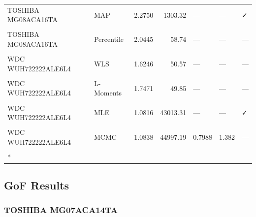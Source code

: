 \documentclass[
]{article}
\begin{document}
\begin{longtable}[t]{llrrlll}
\addlinespace
TOSHIBA MG08ACA16TA & MAP & 2.2750 & 1303.32 & — & — & ✓\\
\cellcolor{gray!10}{TOSHIBA MG08ACA16TA} & \cellcolor{gray!10}{MCMC} & \cellcolor{gray!10}{1.2643} & \cellcolor{gray!10}{12023.10} & \cellcolor{gray!10}{1.001} & \cellcolor{gray!10}{1.5386} & \cellcolor{gray!10}{—}\\
TOSHIBA MG08ACA16TA & Percentile & 2.0445 & 58.74 & — & — & —\\
\cellcolor{gray!10}{WDC WUH722222ALE6L4} & \cellcolor{gray!10}{OLS} & \cellcolor{gray!10}{1.5872} & \cellcolor{gray!10}{50.96} & \cellcolor{gray!10}{—} & \cellcolor{gray!10}{—} & \cellcolor{gray!10}{—}\\
WDC WUH722222ALE6L4 & WLS & 1.6246 & 50.57 & — & — & —\\
\addlinespace
\cellcolor{gray!10}{WDC WUH722222ALE6L4} & \cellcolor{gray!10}{MOM} & \cellcolor{gray!10}{1.8085} & \cellcolor{gray!10}{49.94} & \cellcolor{gray!10}{—} & \cellcolor{gray!10}{—} & \cellcolor{gray!10}{—}\\
WDC WUH722222ALE6L4 & L-Moments & 1.7471 & 49.85 & — & — & —\\
\cellcolor{gray!10}{WDC WUH722222ALE6L4} & \cellcolor{gray!10}{EPF} & \cellcolor{gray!10}{1.8787} & \cellcolor{gray!10}{50.02} & \cellcolor{gray!10}{—} & \cellcolor{gray!10}{—} & \cellcolor{gray!10}{—}\\
WDC WUH722222ALE6L4 & MLE & 1.0816 & 43013.31 & — & — & ✓\\
\cellcolor{gray!10}{WDC WUH722222ALE6L4} & \cellcolor{gray!10}{MAP} & \cellcolor{gray!10}{2.5148} & \cellcolor{gray!10}{1189.11} & \cellcolor{gray!10}{—} & \cellcolor{gray!10}{—} & \cellcolor{gray!10}{✓}\\
\addlinespace
WDC WUH722222ALE6L4 & MCMC & 1.0838 & 44997.19 & 0.7988 & 1.382 & —\\
\cellcolor{gray!10}{WDC WUH722222ALE6L4} & \cellcolor{gray!10}{Percentile} & \cellcolor{gray!10}{1.9762} & \cellcolor{gray!10}{53.73} & \cellcolor{gray!10}{—} & \cellcolor{gray!10}{—} & \cellcolor{gray!10}{—}\\*
\end{longtable}
\endgroup{}

\subsection{GoF Results}\label{gof-results}

\subsubsection{TOSHIBA MG07ACA14TA}\label{toshiba-mg07aca14ta}
\end{document}
